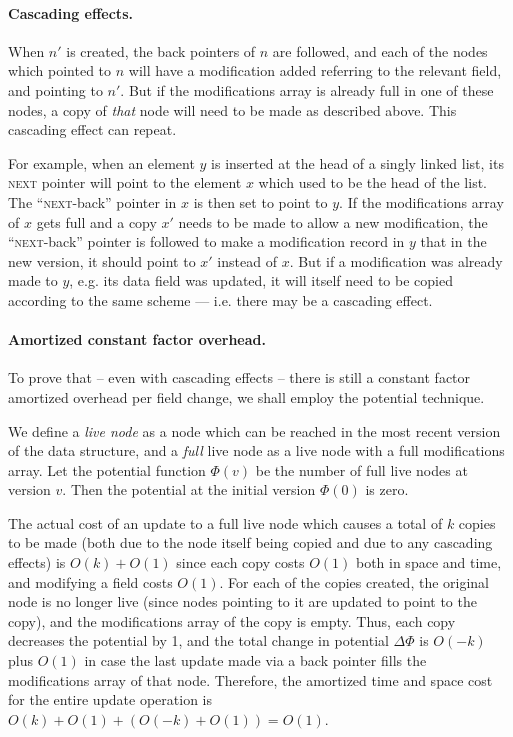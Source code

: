 \paragraph{Cascading effects.}

When $n'$ is created, the back pointers of $n$ are followed, and each of the
nodes which pointed to $n$ will have a modification added referring to the
relevant field, and pointing to $n'$. But if the modifications array is already
full in one of these nodes, a copy of \emph{that} node will need to be made as
described above. This cascading effect can repeat.

For example, when an element $y$ is inserted at the head of a singly linked
list, its \textsc{next} pointer will point to the element $x$ which used to be
the head of the list. The ``\textsc{next}-back'' pointer in $x$ is then set to
point to $y$. If the modifications array of $x$ gets full and a copy $x'$ needs
to be made to allow a new modification, the ``\textsc{next}-back'' pointer is
followed to make a modification record in $y$ that in the new version, it should
point to $x'$ instead of $x$. But if a modification was already made to $y$,
e.g. its data field was updated, it will itself need to be copied according to
the same scheme --- i.e. there may be a cascading effect.

\paragraph{Amortized constant factor overhead.}
To prove that -- even with cascading effects -- there is still a constant factor
amortized overhead per field change, we shall employ the potential technique.

We define a \emph{live node} as a node which can be reached in the most recent
version of the data structure, and a \emph{full} live node as a live node with a
full modifications array. Let the potential function $\Phi(v)$ be the number of
full live nodes at version $v$. Then the potential at the initial version
$\Phi(0)$ is zero.

The actual cost of an update to a full live node which causes a total of $k$
copies to be made (both due to the node itself being copied and due to any
cascading effects) is $O(k) + O(1)$ since each copy costs $O(1)$ both in space
and time, and modifying a field costs $O(1)$. For each of the copies created,
the original node is no longer live (since nodes pointing to it are updated to
point to the copy), and the modifications array of the copy is empty. Thus, each
copy decreases the potential by 1, and the total change in potential
$\Delta\Phi$ is $O(-k)$ plus $O(1)$ in case the last update made via a back
pointer fills the modifications array of that node. Therefore, the amortized
time and space cost for the entire update operation is $O(k) + O(1) + (O(-k) +
O(1)) = O(1)$.

